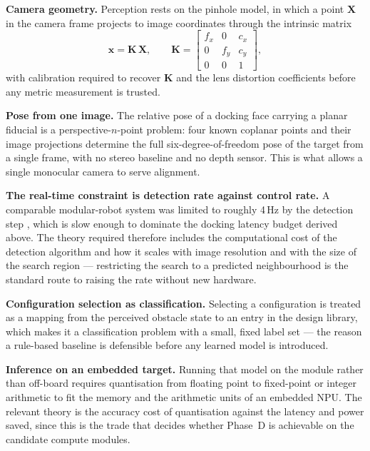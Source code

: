 \documentclass[11pt,a4paper]{article}
\newif\ifreview
\newcommand{\pending}[1]{\ifreview{\color{blue}#1}\else#1\fi}
\begin{document}
\pending{%
\noindent\textbf{Camera geometry.} Perception rests on the pinhole model, in
which a point $\mathbf{X}$ in the camera frame projects to image coordinates
through the intrinsic matrix
\begin{equation}
  \mathbf{x} = \mathbf{K}\,\mathbf{X},
  \qquad
  \mathbf{K} = \begin{bmatrix}
    f_x & 0 & c_x \\ 0 & f_y & c_y \\ 0 & 0 & 1
  \end{bmatrix},
\end{equation}
with calibration required to recover $\mathbf{K}$ and the lens distortion
coefficients before any metric measurement is trusted.

\noindent\textbf{Pose from one image.} The relative pose of a docking face
carrying a planar fiducial is a perspective-$n$-point problem: four known
coplanar points and their image projections determine the full six-degree-of-freedom
pose of the target from a single frame, with no stereo baseline and no depth
sensor. This is what allows a single monocular camera to serve alignment.

\noindent\textbf{The real-time constraint is detection rate against control
rate.} A comparable modular-robot system was limited to roughly 4\,Hz by the
detection step \cite{jing2018}, which is slow enough to dominate the docking
latency budget derived above. The theory required therefore includes the
computational cost of the detection algorithm and how it scales with image
resolution and with the size of the search region --- restricting the search to
a predicted neighbourhood is the standard route to raising the rate without
new hardware.

\noindent\textbf{Configuration selection as classification.} Selecting a
configuration is treated as a mapping from the perceived obstacle state to an
entry in the design library, which makes it a classification problem with a
small, fixed label set --- the reason a rule-based baseline is defensible
before any learned model is introduced.

\noindent\textbf{Inference on an embedded target.} Running that model on the
module rather than off-board requires quantisation from floating point to
fixed-point or integer arithmetic to fit the memory and the arithmetic units of
an embedded NPU. The relevant theory is the accuracy cost of quantisation
against the latency and power saved, since this is the trade that decides
whether Phase~D is achievable on the candidate compute modules.
}
\end{document}
